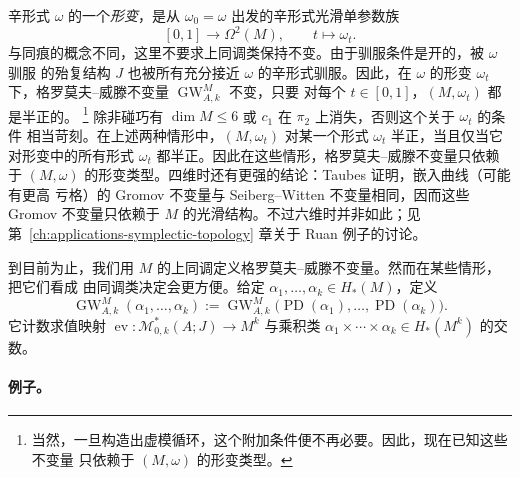 \begin{remark}\label{rem:7-1-11}
辛形式 $\omega$ 的一个\emph{形变}，是从 $\omega_0=\omega$ 出发的辛形式光滑单参数族
\[
  [0,1]\longrightarrow\Omega^2(M),
  \qquad t\longmapsto\omega_t.
\]
与同痕的概念不同，这里不要求上同调类保持不变。由于驯服条件是开的，被 $\omega$ 驯服
的殆复结构 $J$ 也被所有充分接近 $\omega$ 的辛形式驯服。因此，在 $\omega$ 的形变
$\omega_t$ 下，格罗莫夫--威滕不变量 $\operatorname{GW}^{M}_{A,k}$ 不变，只要
对每个 $t\in[0,1]$，$(M,\omega_t)$ 都是半正的。
\footnote{当然，一旦构造出虚模循环，这个附加条件便不再必要。因此，现在已知这些不变量
只依赖于 $(M,\omega)$ 的形变类型。}
除非碰巧有 $\dim M\le6$ 或 $c_1$ 在 $\pi_2$ 上消失，否则这个关于 $\omega_t$ 的条件
相当苛刻。在上述两种情形中，$(M,\omega_t)$ 对某一个形式 $\omega_t$ 半正，当且仅当它
对形变中的所有形式 $\omega_t$ 都半正。因此在这些情形，格罗莫夫--威滕不变量只依赖于
$(M,\omega)$ 的形变类型。四维时还有更强的结论：Taubes 证明，嵌入曲线（可能有更高
亏格）的 Gromov 不变量与 Seiberg--Witten 不变量相同，因而这些 Gromov 不变量只依赖于
$M$ 的光滑结构。不过六维时并非如此；见第~\ref{ch:applications-symplectic-topology} 章关于 Ruan 例子的讨论。
\end{remark}

\begin{remark}[同调的不变量]\label{rem:7-1-12}
到目前为止，我们用 $M$ 的上同调定义格罗莫夫--威滕不变量。然而在某些情形，把它们看成
由同调类决定会更方便。给定 $\alpha_1,\ldots,\alpha_k\in H_*(M)$，定义
\[
  \operatorname{GW}^{M}_{A,k}(\alpha_1,\ldots,\alpha_k)
  :=\operatorname{GW}^{M}_{A,k}
  \bigl(\operatorname{PD}(\alpha_1),\ldots,\operatorname{PD}(\alpha_k)\bigr).
\]
它计数求值映射
$\operatorname{ev}:\mathcal M^*_{0,k}(A;J)\to M^k$ 与乘积类
$\alpha_1\times\cdots\times\alpha_k\in H_*(M^k)$ 的交数。
\end{remark}

\paragraph{例子。}

